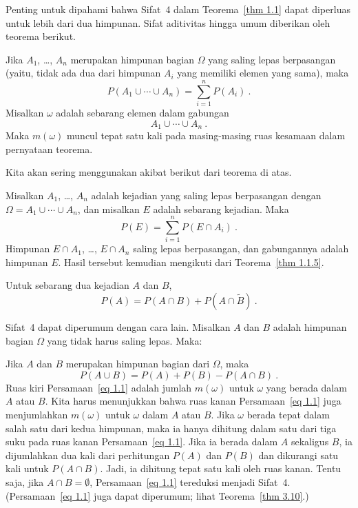 \par
Penting untuk dipahami bahwa Sifat~4 dalam Teorema~\ref{thm 1.1} 
dapat diperluas untuk lebih dari dua himpunan.  Sifat aditivitas hingga
umum diberikan oleh
teorema berikut.\hfil\break
\begin{theorem}\label{thm 1.1.5}
Jika $A_1$, \dots, $A_n$ merupakan himpunan bagian $\Omega$ yang saling lepas berpasangan
(yaitu, tidak ada dua dari himpunan $A_i$ yang memiliki elemen yang sama), maka
$$
P(A_1 \cup \cdots \cup A_n) = \sum_{i = 1}^n P(A_i)\ .
$$
\proof
Misalkan $\omega$ adalah sebarang elemen dalam gabungan
$$A_1 \cup \cdots \cup A_n\ .$$
Maka $m(\omega)$ muncul tepat satu kali pada masing-masing ruas kesamaan dalam
pernyataan teorema.
\end{theorem} 
\par
Kita akan sering menggunakan akibat berikut dari teorema di atas.
\begin{theorem}\label{thm 1.2}
 Misalkan $A_1$, \dots, $A_n$ adalah kejadian yang saling lepas berpasangan dengan $\Omega = A_1
\cup \cdots \cup A_n$, dan misalkan $E$ adalah sebarang kejadian.  Maka
$$
P(E) = \sum_{i = 1}^n P(E \cap A_i)\ .
$$
\proof
Himpunan $E \cap A_1$, \dots, $E \cap A_n$ saling lepas berpasangan, dan 
gabungannya adalah himpunan $E$.  Hasil tersebut kemudian mengikuti dari Teorema~\ref{thm 1.1.5}.
\end{theorem}
\begin{corollary}\label{cor 1.1}
Untuk sebarang dua kejadian $A$ dan $B$,
$$
P(A) = P(A \cap B) + P(A \cap \tilde B)\ .
$$
\end{corollary}
\par
Sifat~4 dapat diperumum dengan cara lain.  Misalkan $A$ dan $B$ adalah
himpunan bagian $\Omega$ yang tidak harus saling lepas.  Maka:\hfil\break
\begin{theorem}\label{thm 1.2.5}
Jika $A$ dan $B$ merupakan himpunan bagian dari $\Omega$, maka
\begin{equation}
P(A \cup B) = P(A) + P(B) - P(A \cap B)\ .
\label{eq 1.1}
\end{equation}                                                        
\proof
Ruas kiri Persamaan~\ref{eq 1.1} adalah jumlah $m(\omega)$ untuk     
$\omega$ yang berada dalam $A$ atau $B$.  Kita harus menunjukkan bahwa ruas kanan 
Persamaan~\ref{eq 1.1} juga menjumlahkan $m(\omega)$ untuk $\omega$ dalam $A$ atau $B$. 
Jika $\omega$ berada tepat dalam salah satu dari kedua himpunan, maka ia hanya dihitung dalam satu
dari tiga suku pada ruas kanan Persamaan~\ref{eq 1.1}.                
Jika ia berada dalam $A$ sekaligus $B$, ia dijumlahkan dua kali dari perhitungan
$P(A)$ dan $P(B)$
dan dikurangi satu kali untuk $P(A \cap B)$.  Jadi, ia dihitung tepat satu kali oleh
ruas kanan.  Tentu saja, jika $A \cap B = \emptyset$, Persamaan~\ref{eq 1.1} 
tereduksi menjadi Sifat~4.
(Persamaan~\ref{eq 1.1} juga dapat diperumum; lihat Teorema~\ref{thm 3.10}.)               
\end{theorem}


